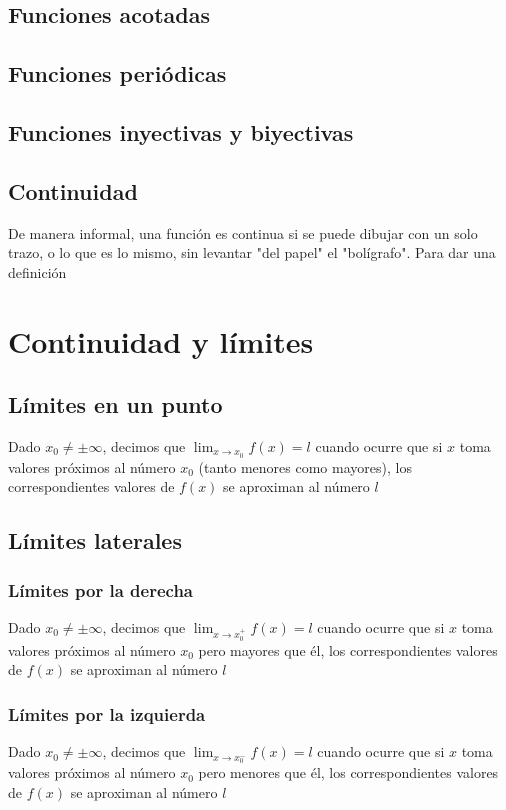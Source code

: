 \subsection{Funciones acotadas}
\subsection{Funciones periódicas}
\subsection{Funciones inyectivas y biyectivas}
\subsection{Continuidad}
De manera informal, una función es continua si se puede dibujar con un solo trazo, o lo que es lo mismo, sin levantar "del papel" el "bolígrafo". Para dar una definición


\section{Continuidad y límites}
\subsection{Límites en un punto}
Dado $x_0\neq\pm\infty$, decimos que $\lim_{x \to x_0} f(x) = l $ cuando ocurre que si $x$ toma valores próximos al número $x_0$ (tanto menores como mayores), los correspondientes valores de $f (x)$ se aproximan al número $l$

\subsection{Límites laterales}

\subsubsection{Límites por la derecha} Dado $x_0\neq\pm\infty$, decimos que $\lim_{x \to x_0^+} f(x) = l $ cuando ocurre que si $x$ toma valores próximos al número $x_0$ pero  mayores que él, los correspondientes valores de $f (x)$ se aproximan al número $l$

\subsubsection{Límites por la izquierda} Dado $x_0\neq\pm\infty$, decimos que $\lim_{x \to x_0^-} f(x) = l $ cuando ocurre que si $x$ toma valores próximos al número $x_0$ pero  menores que él, los correspondientes valores de $f (x)$ se aproximan al número $l$

